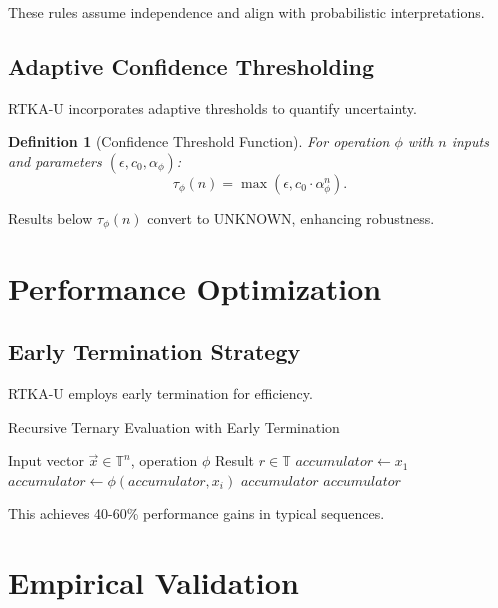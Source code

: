 \documentclass[11pt,a4paper]{article}
\newtheorem{definition}{Definition}
\begin{document}
These rules assume independence and align with probabilistic interpretations.

\subsection{Adaptive Confidence Thresholding}

RTKA-U incorporates adaptive thresholds to quantify uncertainty.

\begin{definition}[Confidence Threshold Function]
For operation $\phi$ with $n$ inputs and parameters $(\epsilon, c_0, \alpha_\phi)$:
\begin{equation}
\tau_\phi(n) = \max\left(\epsilon, c_0 \cdot \alpha_\phi^n\right).
\end{equation}
\end{definition}

Results below $\tau_\phi(n)$ convert to UNKNOWN, enhancing robustness.

\section{Performance Optimization}

\subsection{Early Termination Strategy}

RTKA-U employs early termination for efficiency.

\begin{algorithm}
\caption{Recursive Ternary Evaluation with Early Termination}
\begin{algorithmic}[1]
\REQUIRE Input vector $\vec{x} \in \mathbb{T}^n$, operation $\phi$
\ENSURE Result $r \in \mathbb{T}$
\STATE $accumulator \leftarrow x_1$
    \STATE $accumulator \leftarrow \phi(accumulator, x_i)$
        \RETURN $accumulator$ 
    \ENDIF
\ENDFOR
\RETURN $accumulator$
\end{algorithmic}
\end{algorithm}

This achieves 40-60\% performance gains in typical sequences.

\section{Empirical Validation}
\end{document}
